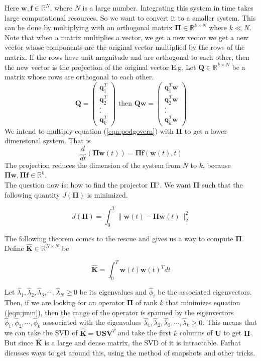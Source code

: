 \documentclass{article}
\newcommand{\beq}{\begin{equation}}
\newcommand{\eeq}{\end{equation}}
\newcommand{\dd}[2]{\frac{d}{d{#2}}{(#1)} }
\newcommand{\bw}{{\mathbf{w}}}
\newcommand{\bff}{\mathbf{f}}
\newcommand{\bPi}{\mathbf{\Pi}}
\newcommand{\bQ}{{\mathbf{Q}}}
\newcommand{\bq}{{\mathbf{q}}}
\newcommand{\bK}{{\mathbf{K}}}
\newcommand{\bU}{{\mathbf{U}}}
\newcommand{\bS}{{\mathbf{S}}}
\newcommand{\bV}{{\mathbf{V}}}
\begin{document}
Here $\bw,\bff \in \mathbb{R}^{N}$, where $N$ is a large number. Integrating this system in time takes large computational resources. So we want to convert it to a smaller system. This can be done by multiplying with an orthogonal matrix $\bPi\in\mathbb{R}^{k\times{N}}$ where $k\ll N$. Note that when a matrix multiplies a vector, we get a new vector we get a new vector whose components are the original vector multiplied by the rows of the matrix. If the rows have unit magnitude and are orthogonal to each other, then the new vector is the projection of the original vector E.g. Let $\bQ\in\mathbb{R}^{k\times{N}}$ be a matrix whose rows are orthogonal to each other.
\beq
\bQ = \begin{pmatrix} \bq_1^T\\ \bq_2^T\\ .\\ . \\ \bq_k^T\end{pmatrix} \text{ then }
\bQ\bw = \begin{pmatrix} \bq_1^T\bw\\ \bq_2^T\bw\\ .\\ . \\ \bq_k^T\bw\end{pmatrix}
\eeq
We intend to multiply equation (\ref{eqn:podgovern}) with $\bPi$ to get a lower dimensional system. That is 
\beq
\label{eqn:podgovernproj}
\dd{\bPi\bw(t)}{t} = \bPi\bff(\bw(t),t)
\eeq
The projection reduces the dimension of the system from $N$ to $k$, because $\bPi\bw,\bPi\bff \in \mathbb{R}^{k}$.\\

The question now is: how to find the projector $\bPi$?. We want $\bPi$ such that the following quantity $J(\bPi)$ is minimized.

\beq
\label{eqn:jmin}
J(\bPi)=\int_{0}^{T} \|\bw(t)-\bPi\bw(t)\|_2^2
\eeq

The following theorem comes to the rescue and gives us a way to compute $\bPi$. Define $\hat{\bK}\in \mathbb{R}^{N\times{N}}$ be

\beq
\label{eqn:continuousxxt}
\hat{\bK} = \int_{0}^{T} \bw(t)\bw(t)^T dt
\eeq

Let $\hat{\lambda}_1,\hat{\lambda}_2,\hat{\lambda}_3,\cdots,\hat{\lambda}_N \ge 0$ be its eigenvalues and $\hat{\phi}_i$ be the associated eigenvectors. Then, if we are looking for an operator $\bPi$ of rank $k$ that minimizes equation (\ref{eqn:jmin}), then the range of the operator is spanned by the eigenvectors $\hat{\phi}_1,\hat{\phi}_2,\cdots,\hat{\phi}_k$ asssociated with the eigenvalues $\hat{\lambda}_1,\hat{\lambda}_2,\hat{\lambda}_3,\cdots,\hat{\lambda}_k \ge 0$. This means that we can take the SVD of $\hat{\bK}=\bU\bS\bV^T$ and take the first $k$ columns of $\bU$ to get $\bPi$. But since $\hat{\bK}$ is a large and dense matrix, the SVD of it is intractable. Farhat dicusses ways to get around this, using the method of snapshots and other tricks.
\end{document}
